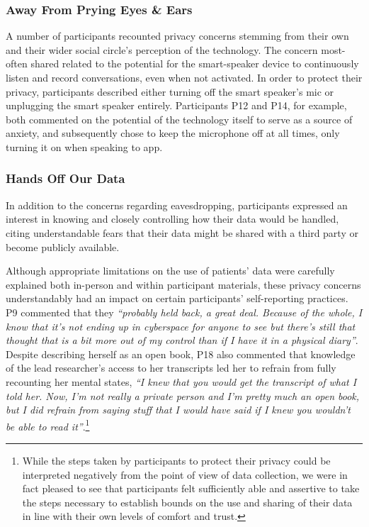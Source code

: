         \subsubsection{Away From Prying Eyes \& Ears} %
        
            A number of participants recounted privacy concerns stemming from their own and their wider social circle's perception of the technology. The concern most-often shared related to the potential for the smart-speaker device to continuously listen and record conversations, even when not activated. In order to protect their privacy, participants described either turning off the smart speaker's mic or unplugging the smart speaker entirely. Participants P12 and P14, for example, both commented on the potential of the technology itself to serve as a source of anxiety, and subsequently chose to keep the microphone off at all times, only turning it on when speaking to \acl{app}.
   
        \subsubsection{Hands Off Our Data} %
            
            In addition to the concerns regarding eavesdropping, participants expressed an interest in knowing and closely controlling how their data would be handled, citing understandable fears that their data might be shared with a third party or become publicly available. 
            
            Although appropriate limitations on the use of patients' data were carefully explained both in-person and within participant materials, these privacy concerns understandably had an impact on certain participants' self-reporting practices. P9 commented that they \textit{``probably held back, a great deal. Because of the whole, I know that it's not ending up in cyberspace for anyone to see but there's still that thought that is a bit more out of my control than if I have it in a physical diary''}. Despite describing herself as an open book, P18 also commented that knowledge of the lead researcher's access to her transcripts led her to refrain from fully recounting her mental states, \textit{``I knew that you would get the transcript of what I told her. Now, I'm not really a private person and I'm pretty much an open book, but I did refrain from saying stuff that I would have said if I knew you wouldn't be able to read it''}.\footnote{While the steps taken by participants to protect their privacy could be interpreted negatively from the point of view of data collection, we were in fact pleased to see that participants felt sufficiently able and assertive to take the steps necessary to establish bounds on the use and sharing of their data in line with their own levels of comfort and trust.}
        
